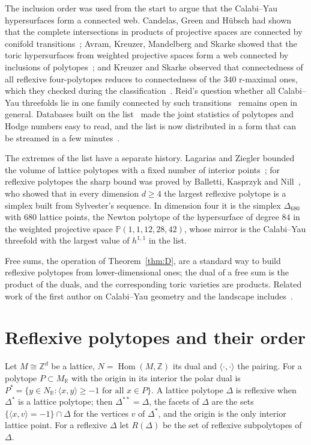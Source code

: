 \documentclass[11pt]{amsart}
\theoremstyle{definition}
\theoremstyle{remark}
\newcommand{\R}{\mathbb{R}}
\newcommand{\Z}{\mathbb{Z}}
\newcommand{\ip}[2]{\langle #1,#2\rangle}
\DeclareMathOperator{\Hom}{Hom}
\newcommand{\Dbig}{\Delta_{680}}
\begin{document}
The inclusion order was used from the start to argue that the Calabi--Yau
hypersurfaces form a connected web. Candelas, Green and H\"ubsch had shown
that the complete intersections in products of projective spaces are
connected by conifold transitions~\cite{CGH90}; Avram, Kreuzer, Mandelberg
and Skarke showed that the toric hypersurfaces from weighted projective
spaces form a web connected by inclusions of polytopes~\cite{AKMS97}; and
Kreuzer and Skarke observed that connectedness of all reflexive
four-polytopes reduces to connectedness of the $340$ r-maximal ones, which
they checked during the classification~\cite{KS00}. Reid's question whether
all Calabi--Yau threefolds lie in one family connected by such
transitions~\cite{Rei87} remains open in general. Databases built on the
list~\cite{AGHJN15} made the joint statistics of polytopes and Hodge
numbers easy to read, and the list is now distributed in a form that can be
streamed in a few minutes~\cite{HF4D}.

The extremes of the list have a separate history. Lagarias and Ziegler
bounded the volume of lattice polytopes with a fixed number of interior
points~\cite{LZ91}; for reflexive polytopes the sharp bound was proved by
Balletti, Kasprzyk and Nill~\cite{BKN22}, who showed that in every
dimension $d\ge4$ the largest reflexive polytope is a simplex built from
Sylvester's sequence. In dimension four it is the simplex $\Dbig$ with
$680$ lattice points, the Newton polytope of the hypersurface of degree
$84$ in the weighted projective space $\mathbb{P}(1,1,12,28,42)$, whose
mirror is the Calabi--Yau threefold with the largest value of $h^{1,1}$ in
the list.

Free sums, the operation of Theorem~\ref{thm:D}, are a standard way to
build reflexive polytopes from lower-dimensional ones; the dual of a free
sum is the product of the duals, and the corresponding toric varieties are
products. Related work of the first author on Calabi--Yau geometry and the
landscape includes~\cite{Bha26c}.

\section{Reflexive polytopes and their order}\label{sec:prelim}

Let $M\cong\Z^d$ be a lattice, $N=\Hom(M,\Z)$ its dual and
$\ip{\cdot}{\cdot}$ the pairing. For a polytope $P\subset M_\R$ with the
origin in its interior the polar dual is
$P^*=\{y\in N_\R:\ip{x}{y}\ge-1\text{ for all }x\in P\}$. A lattice polytope
$\Delta$ is reflexive when $\Delta^*$ is a lattice polytope; then
$\Delta^{**}=\Delta$, the facets of $\Delta$ are the sets
$\{\ip{x}{v}=-1\}\cap\Delta$ for the vertices $v$ of $\Delta^*$, and the
origin is the only interior lattice point. For a reflexive $\Delta$ let
$R(\Delta)$ be the set of reflexive subpolytopes of $\Delta$.
\end{document}
